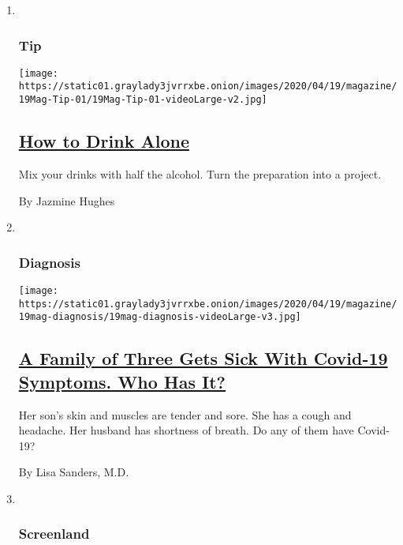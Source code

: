 \begin{enumerate}
\def\labelenumi{\arabic{enumi}.}
\item ~
  \hypertarget{tip}{%
  \subsubsection{Tip}\label{tip}}

  \texttt{[image: https://static01.graylady3jvrrxbe.onion/images/2020/04/19/magazine/19Mag-Tip-01/19Mag-Tip-01-videoLarge-v2.jpg]}

  \hypertarget{how-to-drink-alone}{%
  \subsection{\texorpdfstring{\href{/2020/04/14/magazine/how-to-drink-alone.html}{How
  to Drink Alone}}{How to Drink Alone}}\label{how-to-drink-alone}}

  Mix your drinks with half the alcohol. Turn the preparation into a
  project.

  By Jazmine Hughes
\item ~
  \hypertarget{diagnosis}{%
  \subsubsection{Diagnosis}\label{diagnosis}}

  \texttt{[image: https://static01.graylady3jvrrxbe.onion/images/2020/04/19/magazine/19mag-diagnosis/19mag-diagnosis-videoLarge-v3.jpg]}

  \hypertarget{a-family-of-three-gets-sick-with-covid-19-symptoms-who-has-it}{%
  \subsection{\texorpdfstring{\href{/2020/04/14/magazine/covid-symptoms-diagnosis.html}{A
  Family of Three Gets Sick With Covid-19 Symptoms. Who Has
  It?}}{A Family of Three Gets Sick With Covid-19 Symptoms. Who Has It?}}\label{a-family-of-three-gets-sick-with-covid-19-symptoms-who-has-it}}

  Her son's skin and muscles are tender and sore. She has a cough and
  headache. Her husband has shortness of breath. Do any of them have
  Covid-19?

  By Lisa Sanders, M.D.
\item ~
  \hypertarget{screenland}{%
  \subsubsection{Screenland}\label{screenland}}


\end{enumerate}
